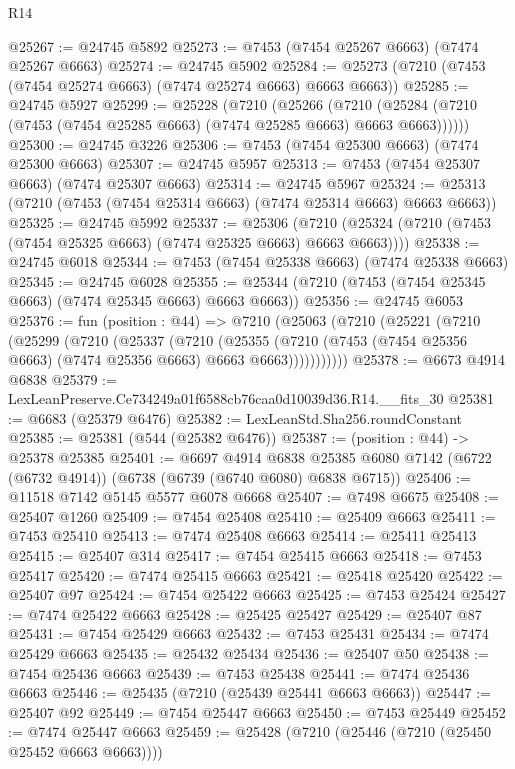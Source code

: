 \begin{lexlean}{R14}
\begin{coremodule}
@25267 := @24745 @5892
@25273 := @7453 (@7454 @25267 @6663) (@7474 @25267 @6663)
@25274 := @24745 @5902
@25284 := @25273 (@7210 (@7453 (@7454 @25274 @6663) (@7474 @25274 @6663) @6663 @6663))
@25285 := @24745 @5927
@25299 := @25228
    (@7210
      (@25266
        (@7210 (@25284 (@7210 (@7453 (@7454 @25285 @6663) (@7474 @25285 @6663) @6663 @6663))))))
@25300 := @24745 @3226
@25306 := @7453 (@7454 @25300 @6663) (@7474 @25300 @6663)
@25307 := @24745 @5957
@25313 := @7453 (@7454 @25307 @6663) (@7474 @25307 @6663)
@25314 := @24745 @5967
@25324 := @25313 (@7210 (@7453 (@7454 @25314 @6663) (@7474 @25314 @6663) @6663 @6663))
@25325 := @24745 @5992
@25337 := @25306
    (@7210 (@25324 (@7210 (@7453 (@7454 @25325 @6663) (@7474 @25325 @6663) @6663 @6663))))
@25338 := @24745 @6018
@25344 := @7453 (@7454 @25338 @6663) (@7474 @25338 @6663)
@25345 := @24745 @6028
@25355 := @25344 (@7210 (@7453 (@7454 @25345 @6663) (@7474 @25345 @6663) @6663 @6663))
@25356 := @24745 @6053
@25376 := fun (position : @44) =>
  @7210
    (@25063
      (@7210
        (@25221
          (@7210
            (@25299
              (@7210
                (@25337
                  (@7210
                    (@25355
                      (@7210 (@7453 (@7454 @25356 @6663) (@7474 @25356 @6663) @6663 @6663)))))))))))
@25378 := @6673 @4914 @6838
@25379 := LexLeanPreserve.Ce734249a01f6588cb76caa0d10039d36.R14.__fits_30
@25381 := @6683 (@25379 @6476)
@25382 := LexLeanStd.Sha256.roundConstant
@25385 := @25381 (@544 (@25382 @6476))
@25387 := (position : @44) -> @25378 @25385
@25401 := @6697
    @4914
    @6838
    @25385
    @6080
    @7142
    (@6722 (@6732 @4914))
    (@6738 (@6739 (@6740 @6080) @6838 @6715))
@25406 := @11518 @7142 @5145 @5577 @6078 @6668
@25407 := @7498 @6675
@25408 := @25407 @1260
@25409 := @7454 @25408
@25410 := @25409 @6663
@25411 := @7453 @25410
@25413 := @7474 @25408 @6663
@25414 := @25411 @25413
@25415 := @25407 @314
@25417 := @7454 @25415 @6663
@25418 := @7453 @25417
@25420 := @7474 @25415 @6663
@25421 := @25418 @25420
@25422 := @25407 @97
@25424 := @7454 @25422 @6663
@25425 := @7453 @25424
@25427 := @7474 @25422 @6663
@25428 := @25425 @25427
@25429 := @25407 @87
@25431 := @7454 @25429 @6663
@25432 := @7453 @25431
@25434 := @7474 @25429 @6663
@25435 := @25432 @25434
@25436 := @25407 @50
@25438 := @7454 @25436 @6663
@25439 := @7453 @25438
@25441 := @7474 @25436 @6663
@25446 := @25435 (@7210 (@25439 @25441 @6663 @6663))
@25447 := @25407 @92
@25449 := @7454 @25447 @6663
@25450 := @7453 @25449
@25452 := @7474 @25447 @6663
@25459 := @25428 (@7210 (@25446 (@7210 (@25450 @25452 @6663 @6663))))

\end{coremodule}
\end{lexlean}
